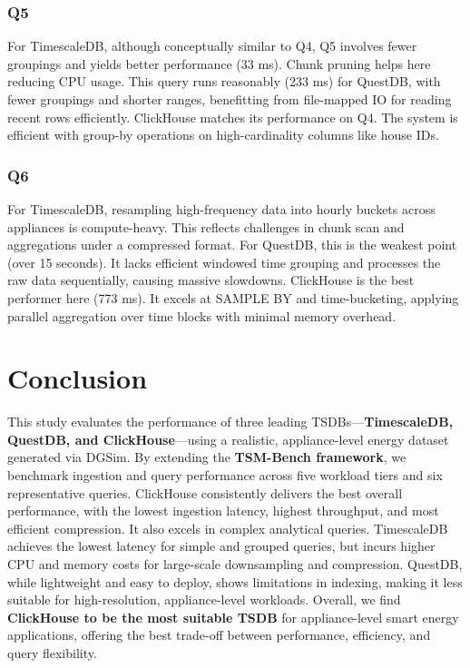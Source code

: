 \documentclass[conference]{IEEEtran}
\begin{document}
\subsubsection{Q5}

For TimescaleDB, although conceptually similar to Q4, Q5 involves fewer groupings and yields better performance (33 ms). Chunk pruning helps here reducing CPU usage.
This query runs reasonably (233 ms) for QuestDB, with fewer groupings and shorter ranges, benefitting from file-mapped IO for reading recent rows efficiently.
ClickHouse matches its performance on Q4. The system is efficient with group-by operations on high-cardinality columns like house IDs.

\subsubsection{Q6}
For TimescaleDB, resampling high-frequency data into hourly buckets across appliances is compute-heavy. This reflects challenges in chunk scan and aggregations under a compressed format.
For QuestDB, this is the weakest point (over 15 seconds). It lacks efficient windowed time grouping and processes the raw data sequentially, causing massive slowdowns.
ClickHouse is the best performer here (773 ms). It excels at SAMPLE BY and time-bucketing, applying parallel aggregation over time blocks with minimal memory overhead.

\section{Conclusion}\label{sec:conclusion}
This study evaluates the performance of three leading TSDBs—\textbf{TimescaleDB, QuestDB, and ClickHouse}—using a realistic, appliance-level energy dataset generated via DGSim. By extending the \textbf{TSM-Bench framework}, we benchmark ingestion and query performance across five workload tiers and six representative queries. ClickHouse consistently delivers the best overall performance, with the lowest ingestion latency, highest throughput, and most efficient compression. It also excels in complex analytical queries. TimescaleDB achieves the lowest latency for simple and grouped queries, but incurs higher CPU and memory costs for large-scale downsampling and compression. QuestDB, while lightweight and easy to deploy, shows limitations in indexing, making it less suitable for high-resolution, appliance-level workloads. Overall, we find \textbf{ClickHouse to be the most suitable TSDB} for appliance-level smart energy applications, offering the best trade-off between performance, efficiency, and query flexibility.
\end{document}
